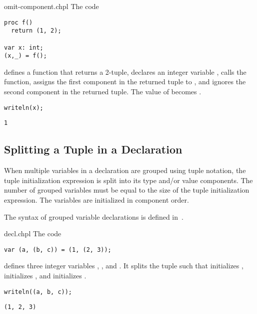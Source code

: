\pagebreak
\begin{chapelexample}{omit-component.chpl}
The code
\begin{chapel}
\begin{verbatim}
proc f()
  return (1, 2);

var x: int;
(x,_) = f();
\end{verbatim}
\end{chapel}
defines a function that returns a 2-tuple, declares an integer
variable , calls the function, assigns the first component in
the returned tuple to , and ignores the second component in
the returned tuple.  The value of  becomes .
\begin{chapelpost}
\begin{verbatim}
writeln(x);
\end{verbatim}
\end{chapelpost}
\begin{chapeloutput}
\begin{verbatim}
1
\end{verbatim}
\end{chapeloutput}
\end{chapelexample}

\subsection{Splitting a Tuple in a Declaration}
\label{Variable_Declarations_in_a_Tuple}

When multiple variables in a declaration are grouped using tuple
notation, the tuple initialization expression is
split into its type and/or value components.  The number of grouped variables must be
equal to the size of the tuple initialization
expression.  The variables are initialized in component order.

The syntax of grouped variable declarations is defined
in~.

\begin{chapelexample}{decl.chpl}
The code
\begin{chapel}
\begin{verbatim}
var (a, (b, c)) = (1, (2, 3));
\end{verbatim}
\end{chapel}
defines three integer variables , , and .  It
splits the tuple  such that 
initializes ,  initializes , and 
initializes .
\begin{chapelpost}
\begin{verbatim}
writeln((a, b, c));
\end{verbatim}
\end{chapelpost}
\begin{chapeloutput}
\begin{verbatim}
(1, 2, 3)
\end{verbatim}
\end{chapeloutput}
\end{chapelexample}

